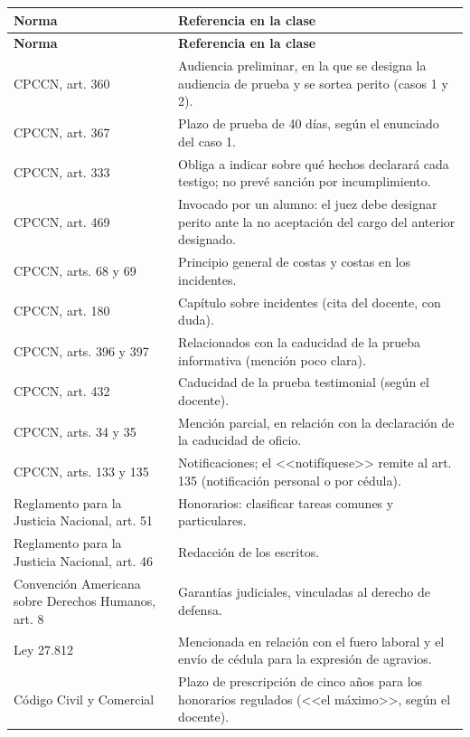 \documentclass[12pt,oneside]{book}
\begin{document}
\begin{longtable}{@{}L{0.30\textwidth}L{0.60\textwidth}@{}}
\toprule
\textbf{Norma} & \textbf{Referencia en la clase} \\
\midrule
\endfirsthead
\toprule
\textbf{Norma} & \textbf{Referencia en la clase} \\
\midrule
\endhead
\bottomrule
\endlastfoot
CPCCN, art. 360 & Audiencia preliminar, en la que se designa la audiencia de prueba y se sortea perito (casos 1 y 2). \\
CPCCN, art. 367 & Plazo de prueba de 40 días, según el enunciado del caso 1. \\
CPCCN, art. 333 & Obliga a indicar sobre qué hechos declarará cada testigo; no prevé sanción por incumplimiento. \\
CPCCN, art. 469 & Invocado por un alumno: el juez debe designar perito ante la no aceptación del cargo del anterior designado. \\
CPCCN, arts. 68 y 69 & Principio general de costas y costas en los incidentes. \\
CPCCN, art. 180 & Capítulo sobre incidentes (cita del docente, con duda). \\
CPCCN, arts. 396 y 397 & Relacionados con la caducidad de la prueba informativa (mención poco clara). \\
CPCCN, art. 432 & Caducidad de la prueba testimonial (según el docente). \\
CPCCN, arts. 34 y 35 & Mención parcial, en relación con la declaración de la caducidad de oficio. \\
CPCCN, arts. 133 y 135 & Notificaciones; el <<notifíquese>> remite al art. 135 (notificación personal o por cédula). \\
Reglamento para la Justicia Nacional, art. 51 & Honorarios: clasificar tareas comunes y particulares. \\
Reglamento para la Justicia Nacional, art. 46 & Redacción de los escritos. \\
Convención Americana sobre Derechos Humanos, art. 8 & Garantías judiciales, vinculadas al derecho de defensa. \\
Ley 27.812 & Mencionada en relación con el fuero laboral y el envío de cédula para la expresión de agravios. \\
Código Civil y Comercial & Plazo de prescripción de cinco años para los honorarios regulados (<<el máximo>>, según el docente). \\
\end{longtable}
\end{document}
